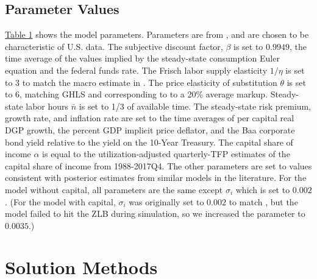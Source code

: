 \documentclass[12pt, final]{article}
\begin{document}
\subsection{Parameter Values} \hyperlink{Table 1}{Table 1} shows the model parameters. Parameters are from \hyperlink{Atkinson}{\color{black}{Atkinson et al.\ (2019)}}, and are chosen to be characteristic of U.S. data. The subjective discount factor, $\beta$ is set to $0.9949$, the time average of the values implied by the steady-state consumption Euler equation and the federal funds rate. The Frisch labor supply elasticity $1/\eta$ is set to 3 to match the macro estimate in \hyperlink{Peterman}{\color{black}{Peterman (2016)}}. The price elasticity of substitution $\theta$ is set to 6, matching GHLS and corresponding to to a 20\% average markup. Steady-state labor hours $\bar{n}$ is set to 1/3 of available time. The steady-state risk premium, growth rate, and inflation rate are set to the time averages of per capital real DGP growth, the percent GDP implicit price deflator, and the Baa corporate bond yield relative to the yield on the 10-Year Treasury. The capital share of income $\alpha$ is equal to the \hyperlink{Fernald}{\color{black}{Fernald (2012)}} utilization-adjusted quarterly-TFP estimates of the capital share of income from 1988-2017Q4. The other parameters are set to values consistent with posterior estimates from similar models in the literature. For the model without capital, all parameters are the same except $\sigma_i$ which is set to $0.002$. (For the model with capital, $\sigma_i$ was originally set to $0.002$ to match \hyperlink{Atkinson}{\color{black}{Atkinson et al.\ (2019)}}, but the model failed to hit the ZLB during simulation, so we increased the parameter to $0.0035$.)

\section[Section 3]{Solution Methods \hypertarget{Section 3}{}} 
\end{document}

